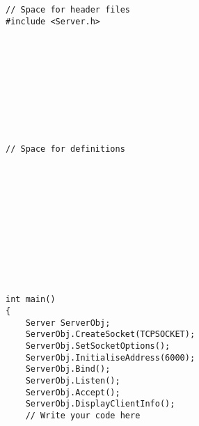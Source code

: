 \documentclass[12pt,a4paper]{article}
\begin{document}
\begin{lstlisting}
// Space for header files
#include <Server.h>










// Space for definitions












int main()
{
	Server ServerObj;
	ServerObj.CreateSocket(TCPSOCKET);
	ServerObj.SetSocketOptions();
	ServerObj.InitialiseAddress(6000);
	ServerObj.Bind();
	ServerObj.Listen();
	ServerObj.Accept();
	ServerObj.DisplayClientInfo();
	// Write your code here
\end{lstlisting}
\newpage~
\newpage~
\newpage~
\newpage~
\newpage
\end{document}
